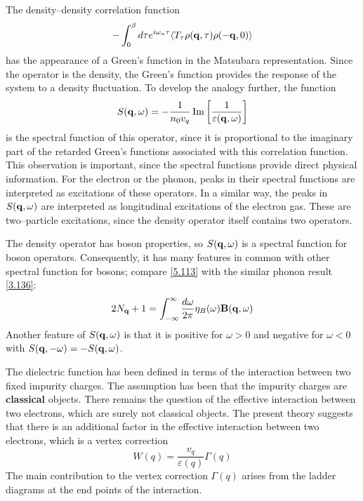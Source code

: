 The density--density correlation function
\begin{equation}
    -\int_0^\beta d\tau e^{i\omega_n \tau} \langle T_\tau \rho(\mathbf{q},\tau) \rho(-\mathbf{q},0)\rangle \label{5.118}
\end{equation}
has the appearance of a Green's function in the Matsubara representation.
Since the operator is the density, the Green's function provides the response of the system to a density fluctuation.
To develop the analogy further, the function
\begin{equation}
    S(\mathbf{q},\omega) = - \frac{1}{n_0 v_q} \Im \left[ \frac{1}{\varepsilon(\mathbf{q},\omega)} \right]   \label{5.119}
\end{equation}
is the spectral function of this operator, since it is proportional to the imaginary part of the retarded Green's functions associated with this correlation function.
This observation is important, since the spectral functions provide direct physical information.
For the electron or the phonon, peaks in their spectral functions are interpreted as excitations of these operators.
In a similar way, the peaks in $S(\mathbf{q},\omega)$ are interpreted as longitudinal excitations of the electron gas.
These are two--particle excitations, since the density operator itself contains two operators.

The density operator has boson properties, so $S(\mathbf{q},\omega)$ is a spectral function for boson operators.
Consequently, it has many features in common with other spectral function for bosons; compare \eqref{5.113} with the similar phonon result \eqref{3.136}:
\begin{equation}
    2N_{\mathbf{q}} + 1 = \int_{-\infty}^\infty \frac{d\omega}{2\pi}  \eta_B(\omega) \mathbf{B}(\mathbf{q},\omega)
\end{equation}
Another feature of $S(\mathbf{q},\omega)$ is that it is positive for $\omega>0$ and negative for $\omega<0$ with $S(\mathbf{q},-\omega)=-S(\mathbf{q},\omega)$.

The dielectric function has been defined in terms of the interaction between two fixed impurity charges.
The assumption has been that the impurity charges are \textbf{classical} objects.
There remains the question of the effective interaction between two electrons, which are surely not classical objects.
The present theory suggests that there is an additional factor in the effective interaction between two electrons, which is a vertex correction
\begin{equation}
    W(q) = \frac{v_q}{\varepsilon(q)} \Gamma(q) \label{5.120}
\end{equation}
The main contribution to the vertex correction $\Gamma(q)$ arises from the ladder diagrams at the end points of the interaction.

